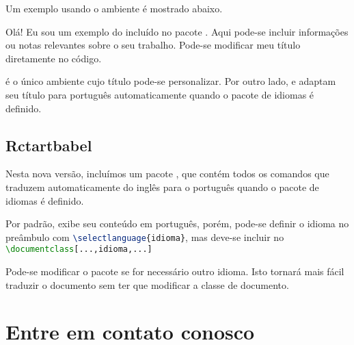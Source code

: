     	Um exemplo usando o ambiente  é mostrado abaixo.
    
        \begin{rctartenv}[frametitle=Ambiente com título personalizado]
            Olá! Eu sou um exemplo do  incluído no pacote . Aqui  pode-se incluir informações ou notas relevantes sobre o seu trabalho. Pode-se modificar meu título diretamente no código.
        \end{rctartenv}
    
         é o único ambiente cujo título pode-se personalizar. Por outro lado,  e  adaptam seu título para português automaticamente quando o pacote de idiomas  é definido.

    \subsection{Rctartbabel}

        Nesta nova versão, incluímos um pacote  , que contém todos os comandos que traduzem automaticamente do inglês para o português quando o pacote de idiomas é definido.
\begin{note}
         Por padrão,  exibe seu conteúdo em português, porém, pode-se definir o idioma no preâmbulo com \lstinline[language=TeX]|\selectlanguage{idioma}|, mas deve-se incluir  no \lstinline[language=TeX]|\documentclass[...,idioma,...]|
\end{note}

        Pode-se modificar o pacote  se for necessário outro idioma. Isto tornará mais fácil traduzir o documento sem ter que modificar a classe de documento.
    
    
        
        
\section*{Entre em contato conosco}

